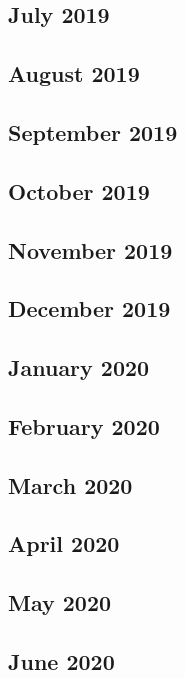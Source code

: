 \documentclass{article}
\begin{document}
	\subsection{July 2019}
	
	\subsection{August 2019}
	
	\subsection{September 2019}
	
	\subsection{October 2019}
	
	\subsection{November 2019}
	
	\subsection{December 2019}
	
	\subsection{January 2020}
	
	\subsection{February 2020}
	
	\subsection{March 2020}
	
	\subsection{April 2020}	
	
	\subsection{May 2020}
	
	\subsection{June 2020}
	
\end{document}

